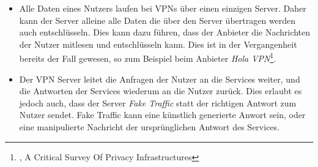 \begin{itemize}
    \item Alle Daten eines Nutzers laufen bei VPNs über einen einzigen Server. Daher kann der Server alleine alle Daten die über den Server übertragen werden auch entschlüsseln. Dies kann dazu führen, dass der Anbieter die Nachrichten der Nutzer mitlesen und entschlüsseln kann. Dies ist in der Vergangenheit bereits der Fall gewesen, so zum Beispiel beim Anbieter \textit{Hola VPN}\footnote{\cite{VPNCriticalSurvey}, A Critical Survey Of Privacy Infrastructures}.
    \item Der VPN Server leitet die Anfragen der Nutzer an die Services weiter, und die Antworten der Services wiederum an die Nutzer zurück. Dies erlaubt es jedoch auch, dass der Server \textit{Fake Traffic} statt der richtigen Antwort zum Nutzer sendet. Fake Traffic kann eine künstlich generierte Anwort sein, oder eine manipulierte Nachricht der ursprünglichen Antwort des Services.
\end{itemize}
